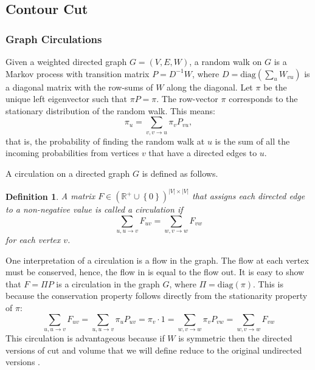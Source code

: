 \documentclass{SMBV12}
\newtheorem{definition}{Definition}
\begin{document}
\subsection{Contour Cut}
\label{sec:normalized_cut}



\subsubsection{Graph Circulations}


Given a weighted directed graph $G = (V, E, W)$, a random walk on $G$ is a Markov process with transition matrix $P = D^{-1}W$, where $D = \mbox{diag}(\sum_{u}W_{vu})$ is a diagonal matrix with the row-sums of $W$ along the diagonal. Let $\pi$ be the unique left eigenvector such that $\pi P = \pi$. The row-vector $\pi$ corresponds to the stationary distribution of the random walk. This means:
\begin{equation}
\pi_u = \sum\limits_{v, v \rightarrow u} \pi_v P_{vu},
\end{equation}
that is, the probability of finding the random walk at $u$ is the sum of all the incoming probabilities from vertices $v$ that have a directed edges to $u$.

A circulation on a directed graph $G$ is defined as follows.
\begin{definition}
A matrix $F \in (\mathbb{R}^+ \cup \left\lbrace 0 \right\rbrace )^{\lvert V \rvert \times \lvert V \rvert}$ that assigns each directed edge to a non-negative value is called a circulation if
\begin{equation}
\sum\limits_{u, u \rightarrow v} F_{uv} = \sum\limits_{w, v \rightarrow w} F_{vw}
\end{equation}
for each vertex $v$.
\end{definition}
One interpretation of a circulation is a flow in the graph. The flow at each vertex must be conserved, hence, the flow in is equal to the flow out. It is easy to show that $F = \Pi P$ is a circulation in the graph $G$, where $\Pi = \mbox{diag}(\pi)$. This is because the conservation property follows directly from the stationarity property of $\pi$:
\begin{equation}
\sum\limits_{u, u \rightarrow v} F_{uv} = \sum\limits_{u, u \rightarrow v} \pi_u P_{uv} = \pi_v \cdot 1 = \sum\limits_{w, v \rightarrow w} \pi_v P_{vw} = \sum\limits_{w, v \rightarrow w} F_{vw}
\end{equation}
This circulation is advantageous because if $W$ is symmetric then the directed versions of cut and volume that we will define reduce to the original undirected versions \cite{gleich2006hierarchical}.
\end{document}
